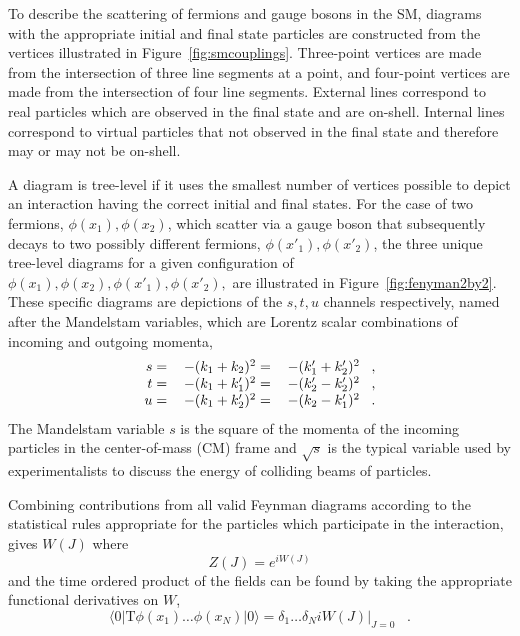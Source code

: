  To describe the scattering of fermions
  and gauge bosons in the SM,
  diagrams with the appropriate initial and final
  state particles are constructed from the 
  vertices illustrated in Figure~\ref{fig:smcouplings}.
 Three-point vertices are made
  from the intersection of three line segments
  at a point, and four-point vertices
  are made from the intersection of four
  line segments.
 External lines correspond to real particles
  which are observed in the final state
  and are on-shell.
 Internal lines correspond to virtual
  particles that not observed in the 
  final state and therefore 
  may or may not be on-shell.

 A diagram is tree-level if it 
  uses the smallest number of vertices possible
  to depict an interaction having the
  correct initial and final states.
 For the case of two fermions, $\phi(x_1),\phi(x_2)$, which scatter
  via a gauge boson that subsequently decays
  to two possibly different fermions, $\phi(x'_1),\phi(x'_2)$,
  the three unique tree-level diagrams for a given 
  configuration of $\phi(x_1),\phi(x_2),\phi(x'_1),\phi(x'_2),$ are
  illustrated in Figure~\ref{fig:fenyman2by2}.
 These specific diagrams 
  are depictions of the $s,t,u$ channels respectively,
  named after the Mandelstam variables,
  which are Lorentz scalar
  combinations of incoming and outgoing momenta,
\begin{equation}
\begin{tabular}{rll} 
$ s = $ & $ - (k_1 + k_2)^2  = $ & $-(k_1' + k_2')^2\;\;\;,$ \\
$ t = $ & $ - (k_1 + k_1')^2 = $ & $-(k_2' - k_2')^2\;\;\;,$ \\
$ u = $ & $ - (k_1 + k_2')^2 = $ & $-(k_2 - k_1')^2 \;\;\;.$
\end{tabular}
\end{equation}
 The Mandelstam variable $s$ is the square of the momenta
  of the incoming particles in the center-of-mass (CM) frame
  and $\sqrt{s}$ is the typical variable used by experimentalists
  to discuss the energy of colliding beams of particles.

 Combining contributions from all
  valid Feynman diagrams 
  according to the statistical rules appropriate
  for the particles which participate in the
  interaction, gives $W(J)$ where 
\begin{equation}
Z(J)=e^{iW(J)}
\end{equation}
  and the time ordered product of the fields
  can be found by taking the appropriate
  functional derivatives on $W$,
\begin{equation}
 \langle 0 | \mathrm{T}\phi(x_1)\dots\phi(x_N) | 0 \rangle = 
  \delta_1\dots\delta_N i W(J) |_{J=0}\;\;\;.
\end{equation}
  

